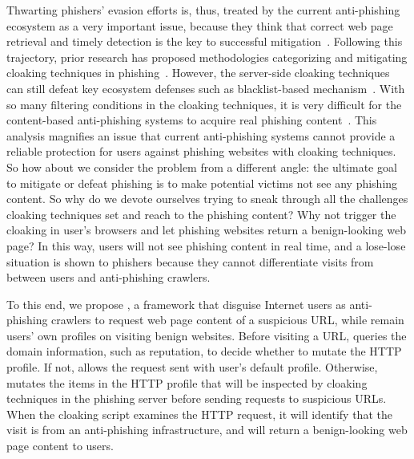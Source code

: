 Thwarting phishers' evasion efforts is, thus, treated by the current anti-phishing ecosystem as a very important issue,
because they think that correct web page retrieval and timely detection is the key to successful mitigation~\cite{oest2020sunrise, zhang2021crawlphish}.
Following this trajectory, prior research has proposed methodologies categorizing and mitigating cloaking techniques in phishing~\cite{oest2018inside, oest2019phishfarm, zhang2021crawlphish}.
However, the server-side cloaking techniques can still defeat key ecosystem defenses such as blacklist-based mechanism~\cite{oest2019phishfarm}.
With so many filtering conditions in the cloaking techniques,
it is very difficult for the content-based anti-phishing systems to acquire real phishing content~\cite{oest2018inside, oest2020phishtime}.
This analysis magnifies an issue that current anti-phishing systems cannot provide a reliable protection for users against phishing websites with cloaking techniques.
So how about we consider the problem from a different angle:
the ultimate goal to mitigate or defeat phishing is to make potential victims not see any phishing content.
So why do we devote ourselves trying to sneak through all the challenges cloaking techniques set and reach to the phishing content?
Why not trigger the cloaking in user's browsers and let phishing websites return a benign-looking web page?
In this way, users will not see phishing content in real time, and a lose-lose situation is shown to phishers because they cannot differentiate visits from between users and anti-phishing crawlers.

To this end, we propose \spartacus, a framework that disguise Internet users as anti-phishing crawlers to request web page content of a suspicious URL, while remain users' own profiles on visiting benign websites.
Before visiting a URL, \spartacus queries the domain information, such as reputation, to decide whether to mutate the HTTP profile.
If not, \spartacus allows the request sent with user's default profile.
Otherwise, \spartacus mutates the items in the HTTP profile that will be inspected by cloaking techniques in the phishing server before sending requests to suspicious URLs.
When the cloaking script examines the HTTP request, it will identify that the visit is from an anti-phishing infrastructure, and will return a benign-looking web page content to users.

